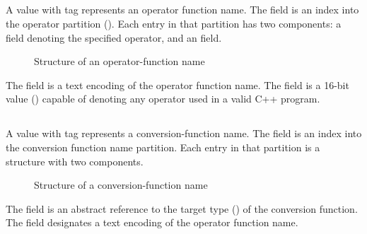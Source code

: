 \subsection{}
\label{sec:ifc:NameSort:Operator}

A  value with tag  represents an operator function name.  
The  field is an index into the operator partition ().  
Each entry in that partition has two components: a  field denoting the specified operator, and an  field.
\begin{figure}[H]
	\centering
	\caption{Structure of an operator-function name}
	\label{fig:ifc-operator-function-structure}
\end{figure}
%
The  field is a text encoding of the operator function name.
The  field is a 16-bit value () 
capable of denoting any operator used in a valid C++ program. 


\subsection{}
\label{sec:ifc:NameSort:Conversion}

A  value with tag  represents a conversion-function name.
The  field is an index into the conversion function name partition.
Each entry in that partition is a structure with two components.
\begin{figure}[H]
	\centering
	\caption{Structure of a conversion-function name}
	\label{fig:ifc-conversion-function-id-structure}
\end{figure}
%
The  field is an abstract reference to the target type () of the conversion function.
The  field designates a text encoding of the operator function name.


